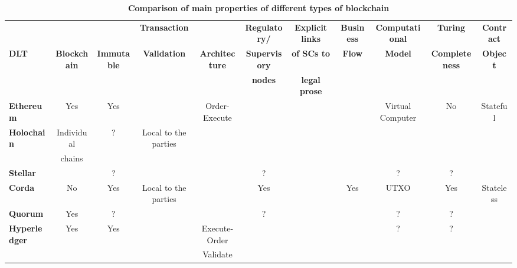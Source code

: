\begin{sidewaystable}
\begin{centering}
{\begin{tabular}{| l | c | c | c | c | c | c | c | c | c | c |}
\hline
				& \textbf{}  & \textbf{}  & \textbf{Transaction} &
				& \textbf{Regulatory/} & \textbf{Explicit links}	&\textbf{Business}
				& \textbf{Computational} & \textbf{Turing}	&\textbf{Contract} \\
\textbf{DLT}		& \textbf{Blockchain} & \textbf{Immutable} & \textbf{Validation} & \textbf{Architecture} 
				& \textbf{Supervisory} & \textbf{of SCs to}	&\textbf{Flow} 
				& \textbf{Model} & \textbf{Completeness}	&\textbf{Object} \\
				& \textbf{} & \textbf{} & \textbf{} &
				& \textbf{nodes} & \textbf{legal prose}	&\textbf{} 
				& \textbf{} & \textbf{}	&\textbf{} \\
\hline
\hline
\textbf{Ethereum}	&Yes			&Yes		&				&Order-Execute	&
				&			&		&Virtual Computer	&No				&Stateful \\
\hline
\textbf{Holochain}	&Individual	&?		&Local to the parties	&				&
				&			& 		&				&				& \\
				&chains		&		&				&				&
				&			& 		&				&				& \\
\hline
\textbf{Stellar}		&			&?		&				&				&?
				&			& 		&?				&?				&\\
\hline
\textbf{Corda} 		&No			&Yes		&Local to the parties	&				&Yes
				&			&Yes		&UTXO			&Yes				&Stateless\\
\hline
\textbf{Quorum} 	&Yes			&?		&				&				&?
				&			& 		&?				&?				&\\
\hline
\textbf{Hyperledger}	&Yes			&Yes		&				&Execute-Order	&
				&			& 		&?				&?				& \\
 				&			&		&				&Validate			&
				&			& 		&				&				& \\
\hline
\end{tabular}}
\caption{\bf \small Comparison of main properties of different types of blockchain}
\label{blockchain_type}
\end{centering}
\end{sidewaystable}





